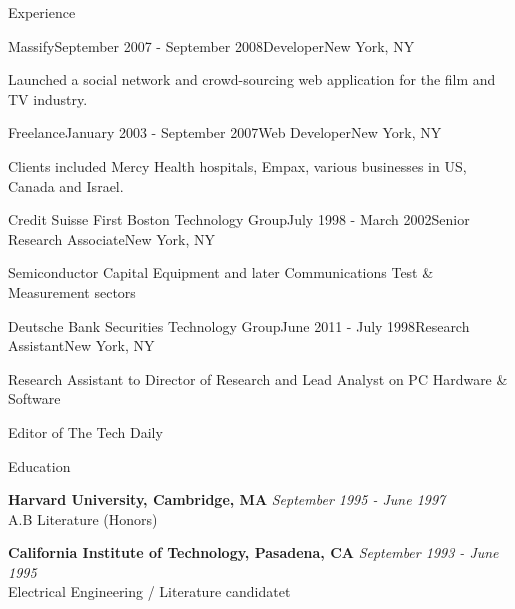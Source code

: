\documentclass{resume} %
\begin{document}
\begin{rSection}{Experience}

\begin{rSubsection}{Massify}{September 2007 - September 2008}{Developer}{New York, NY}
\item Launched a social network and crowd-sourcing web application for the film and TV industry.
\end{rSubsection}


\begin{rSubsection}{Freelance}{January 2003 - September 2007}{Web Developer}{New York, NY}
\item Clients included Mercy Health hospitals, Empax, various businesses in US, Canada and Israel.
\end{rSubsection}


\begin{rSubsection}{Credit Suisse First Boston Technology Group}{July 1998 - March 2002}{Senior Research Associate}{New York, NY}
\item Semiconductor Capital Equipment and later Communications Test \& Measurement sectors
\end{rSubsection}


\begin{rSubsection}{Deutsche Bank Securities Technology Group}{June 2011 - July 1998}{Research Assistant}{New York, NY}
\item Research Assistant to Director of Research and Lead Analyst on PC Hardware \& Software 
\item Editor of The Tech Daily
\end{rSubsection}

\end{rSection}



\begin{rSection}{Education}

{\bf Harvard University, Cambridge, MA} \hfill {\em September 1995 - June 1997} \\ 
A.B Literature (Honors)

{\bf California Institute of Technology, Pasadena, CA} \hfill {\em September 1993 - June 1995} \\ 
Electrical Engineering / Literature candidatet\\

\end{rSection}
\end{document}
